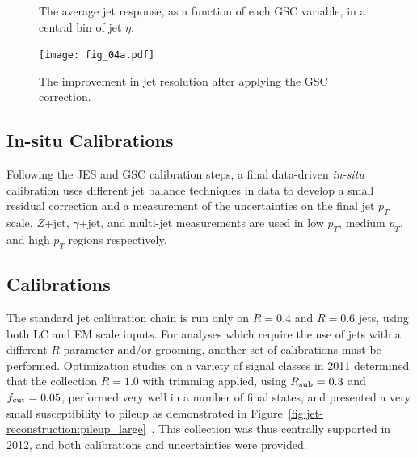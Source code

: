 \begin{figure}
\centering
{}

\label{fig:jet-reconstruction:gsc}
\caption{The average jet response, as a function of each GSC variable, in a central bin of jet $\eta$.}
\end{figure}

\begin{figure}
\centering
\texttt{[image: fig\_04a.pdf]}
\label{fig:jet-reconstruction:resolution_gsc}
\caption{The improvement in jet resolution after applying the GSC correction.}
\end{figure}


\subsection{In-situ Calibrations}

Following the JES and GSC calibration steps, a final data-driven \textit{in-situ} calibration uses different jet balance techniques in data to develop a small residual correction and a measurement of the uncertainties on the final jet $p_T$ scale. $Z$+jet, $\gamma$+jet, and multi-jet measurements are used in low $p_T$, medium $p_T$, and high $p_T$ regions respectively.

\subsection{\LargeR Calibrations}

The standard jet calibration chain is run only on $R=0.4$ and $R=0.6$ jets, using both LC and EM scale inputs. For analyses which require the use of jets with a different $R$ parameter and/or grooming, another set of calibrations must be performed. Optimization studies on a variety of signal classes in 2011 determined that the collection \antikt $R=1.0$ with trimming applied, using $R_{\rm sub} = 0.3$ and $f_{\rm cut} = 0.05$, performed very well in a number of final states, and presented a very small susceptibility to pileup as demonstrated in Figure~\ref{fig:jet-reconstruction:pileup_large}~\cite{ATLAS-SS-2011}. This collection was thus centrally supported in 2012, and both calibrations and uncertainties were provided.

